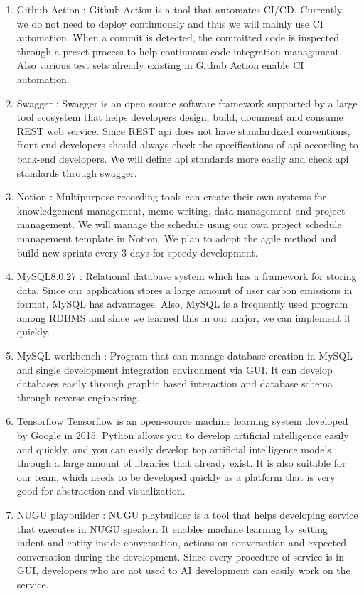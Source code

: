\documentclass[11pt, conference]{IEEEtran}
\begin{document}
\begin{enumerate}[label=\arabic*]
\begin{enumerate}[label=\alph*]
\begin{enumerate}
            \item Github Action : Github Action is a tool that automates CI/CD. Currently, we do not need to deploy continuously and thus we will mainly use CI automation. When a commit is detected, the committed code is inspected through a preset process to help continuous code integration management. Also various test sets already existing in Github Action enable CI automation.
            \item Swagger :  Swagger is an open source software framework supported by a large tool ecosystem that helps developers design, build, document and consume REST web service. Since REST api does not have standardized conventions, front end developers should always check the specifications of api according to back-end developers. We will define api standards more easily and check api standards through swagger. 
            \item Notion : Multipurpose recording tools can create their own systems for knowledgement management, memo writing, data management and project management. We will manage the schedule using our own project schedule management template in Notion. We plan to adopt the agile method and build new sprints every 3 days for speedy development.  
            \item MySQL8.0.27 : Relational database system which has a framework for storing data. Since our application stores a large amount of user carbon emissions in format, MySQL has advantages. Also, MySQL is a frequently used program among RDBMS and since we learned this in our major, we can implement it quickly.
            \item MySQL workbench : Program that can manage database creation in MySQL and single development integration environment via GUI. It can develop databases easily through graphic based interaction and database schema through reverse engineering.
            \item Tensorflow \: Tensorflow is an open-source machine learning system developed by Google in 2015. Python allows you to develop artificial intelligence easily and quickly, and you can easily develop top artificial intelligence models through a large amount of libraries that already exist. It is also suitable for our team, which needs to be developed quickly as a platform that is very good for abstraction and visualization. 
            \item NUGU playbuilder : NUGU playbuilder is a tool that helps developing service that executes in NUGU speaker. It enables machine learning by setting indent and entity inside conversation, actions on conversation and expected conversation during the development. Since every procedure of service is in GUI, developers who are not used to AI development can easily work on the service.\\
            \end{enumerate}
    \end{enumerate}
    

\end{enumerate}
\end{document}
